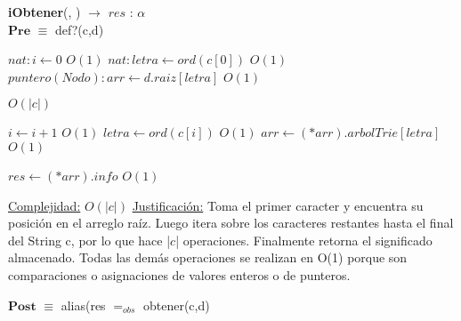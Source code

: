 \begin{algorithm}[H]{\textbf{iObtener}(, ) $\to$ $res$ : $\alpha$}
	{\\ $\textbf{Pre}$ $\equiv$ def?(c,d)}
	\begin{algorithmic}

		\State $nat: i \gets 0$ \Comment $O(1)$
		\State $nat: letra \gets ord(c[0])$ \Comment $O(1)$
		\State $puntero(Nodo): arr \gets d.raiz[letra]$ \Comment $O(1)$

		 \Comment $O(|c|)$

			\State $i \gets i + 1$ \Comment $O(1)$
			\State $letra \gets ord(c[i])$ \Comment $O(1)$
			\State $arr \gets (*arr).arbolTrie[letra]$ \Comment $O(1)$

		\EndWhile

		\State $res \gets (*arr).info$ \Comment $O(1)$

		\medskip
		\Statex \underline{Complejidad:} $O(|c|)$
		\Statex \underline{Justificación:} Toma el primer caracter y encuentra su posición en el arreglo raíz. Luego itera sobre los caracteres restantes hasta el final del String c, por lo que hace |$c$| operaciones. Finalmente retorna el significado almacenado. Todas las demás operaciones se realizan en O(1) porque son comparaciones o asignaciones de valores enteros o de punteros.

    \end{algorithmic}
    {$\textbf{Post}$ $\equiv$ alias(res $=_{obs}$ obtener(c,d)}
\end{algorithm}


